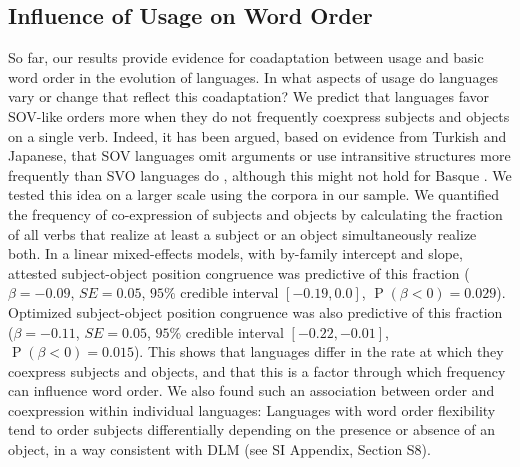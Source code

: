 \documentclass[9pt,twocolumn,twoside,lineno]{pnas-new}
\begin{document}
\subsection*{Influence of Usage on Word Order}
So far, our results provide evidence for coadaptation between usage and basic word order in the evolution of languages.
In what aspects of usage do languages vary or change that reflect this coadaptation?
We predict that languages favor SOV-like orders more when they do not frequently coexpress subjects and objects on a single verb.
Indeed, it has been argued, based on evidence from Turkish and Japanese, that SOV languages omit arguments or use intransitive structures more frequently than SVO languages do \citep{hiranuma1999syntactic,ueno2009does,luk2014investigating}, although this might not hold for Basque \citep{pastor2013processing}.
We tested this idea on a larger scale using the corpora in our sample.
We quantified the frequency of co-expression of subjects and objects by calculating the fraction of all verbs that realize at least a subject or an object simultaneously realize both.
In a linear mixed-effects models, with by-family intercept and slope, attested subject-object position congruence was predictive of this fraction ($\beta=-0.09$, $SE=0.05$, $95\%$ credible interval $[-0.19, 0.0]$, $\operatorname{P}(\beta<0) = 0.029$). %
Optimized subject-object position congruence was also predictive of this fraction ($\beta=-0.11$, $SE=0.05$, $95\%$ credible interval $[-0.22,  -0.01]$, $\operatorname{P}(\beta<0) = 0.015$). %
This shows that languages differ in the rate at which they coexpress subjects and objects, and that this is a factor through which frequency can influence word order.
We also found such an association between order and coexpression within individual languages: Languages with word order flexibility tend to order subjects differentially depending on the presence or absence of an object, in a way consistent with DLM (see SI Appendix, Section S8).



\end{document}
